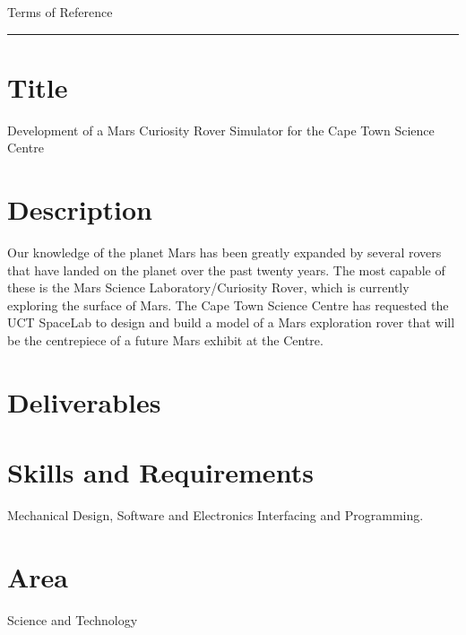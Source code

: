 {\Large Terms of Reference}\\
\hrule

\section*{Title}
  Development of a Mars Curiosity Rover Simulator for the Cape Town Science Centre
\section*{Description}
  Our knowledge of the planet Mars has been greatly expanded by several rovers that have landed on the planet over the past twenty years. The most capable of these is the Mars Science Laboratory/Curiosity Rover, which is currently exploring the surface of Mars. The Cape Town Science Centre has requested the UCT SpaceLab to design and build a model of a Mars exploration rover that will be the centrepiece of a future Mars exhibit at the Centre.
  
\section*{Deliverables}
  
\section*{Skills and Requirements}
  Mechanical Design, Software and Electronics Interfacing and Programming.
  
\section*{Area}
  Science and Technology
